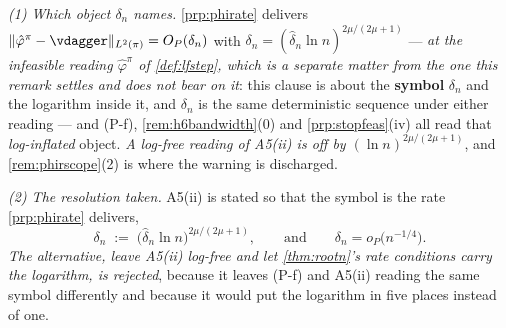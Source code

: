 \begin{remark}\label{rem:rootnlog}
\emph{(1) Which object $\delta_n$ names.} \cref{prp:phirate} delivers
$\|\hat\varphi^{\pi}-\vdagger\|_{L^{2}(\pi)}=O_P(\delta_n)$ with
$\delta_n=(\hat\delta_n\ln n)^{2\mu/(2\mu+1)}$ --- \emph{at the infeasible reading $\hat\varphi^{\pi}$
of \cref{def:lfstep}, which is a separate matter from the one this remark settles and does not bear on
it}: this clause is about the \textbf{symbol} $\delta_n$ and the logarithm inside it, and $\delta_n$ is
the same deterministic sequence under either reading --- and (P-f), \cref{rem:h6bandwidth}\textup{(0)} and
\cref{prp:stopfeas}\textup{(iv)} all read that \emph{log-inflated} object. \emph{A log-free reading of
A5(ii) is off by $(\ln n)^{2\mu/(2\mu+1)}$}, and \cref{rem:phirscope}\textup{(2)} is where the warning
is discharged.

\emph{(2) The resolution taken.} A5(ii) is stated so that the symbol is the rate
\cref{prp:phirate} delivers,
\begin{equation}\label{eq:deltalog}
\delta_n\;:=\;\big(\hat\delta_n\ln n\big)^{2\mu/(2\mu+1)},
\qquad\text{and}\qquad \delta_n=o_P\big(n^{-1/4}\big) .
\end{equation}
\emph{The alternative, leave A5(ii) log-free and let \cref{thm:rootn}'s rate conditions carry
the logarithm, is rejected}, because it leaves (P-f) and A5(ii) reading the same symbol
differently and because it would put the logarithm in five places instead of one.


\end{remark}
